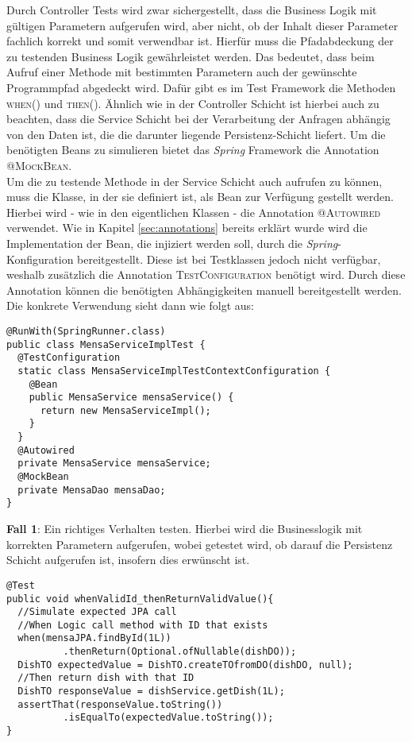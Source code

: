 Durch Controller Tests wird zwar sichergestellt, dass die Business Logik mit gültigen Parametern aufgerufen wird, aber nicht, ob der Inhalt dieser Parameter fachlich korrekt und somit verwendbar ist. Hierfür muss die Pfadabdeckung der zu testenden Business Logik gewährleistet werden. Das bedeutet, dass beim Aufruf einer Methode mit bestimmten Parametern auch der gewünschte Programmpfad abgedeckt wird. Dafür gibt es im Test Framework die Methoden \textsc{when()} und \textsc{then()}. Ähnlich wie in der Controller Schicht ist hierbei auch zu beachten, dass die Service Schicht bei der Verarbeitung der Anfragen abhängig von den Daten ist, die die darunter liegende Persistenz-Schicht liefert. Um die benötigten Beans zu simulieren bietet das \textit{Spring} Framework die Annotation \textsc{@MockBean}.\\
\linebreak
Um die zu testende Methode in der Service Schicht auch aufrufen zu können, muss die Klasse, in der sie definiert ist, als Bean zur Verfügung gestellt werden. Hierbei wird - wie in den eigentlichen Klassen - die Annotation \textsc{@Autowired} verwendet. Wie in Kapitel \ref{sec:annotations} bereits erklärt wurde wird die Implementation der Bean, die injiziert werden soll, durch die \textit{Spring}-Konfiguration bereitgestellt. Diese ist bei Testklassen jedoch nicht verfügbar, weshalb zusätzlich die Annotation \textsc{TestConfiguration} benötigt wird. Durch diese Annotation können die benötigten Abhängigkeiten manuell bereitgestellt werden. Die konkrete Verwendung sieht dann wie folgt aus:

\newpage
\begin{lstlisting}[caption={Basis Initialisierung für Service Tests}, commentstyle=\color{green},]
@RunWith(SpringRunner.class)
public class MensaServiceImplTest {
  @TestConfiguration
  static class MensaServiceImplTestContextConfiguration {
    @Bean
    public MensaService mensaService() {
      return new MensaServiceImpl();
    }
  }
  @Autowired
  private MensaService mensaService;
  @MockBean
  private MensaDao mensaDao;
}
\end{lstlisting}

\textbf{Fall 1}: Ein richtiges Verhalten testen. Hierbei wird die Businesslogik mit korrekten Parametern aufgerufen, wobei getestet wird, ob darauf die Persistenz Schicht aufgerufen ist, insofern dies erwünscht ist.

\begin{lstlisting}[caption={Testen von richtigen Verhalten}, commentstyle=\color{green},]
@Test
public void whenValidId_thenReturnValidValue(){
  //Simulate expected JPA call
  //When Logic call method with ID that exists
  when(mensaJPA.findById(1L))
          .thenReturn(Optional.ofNullable(dishDO));
  DishTO expectedValue = DishTO.createTOfromDO(dishDO, null);
  //Then return dish with that ID
  DishTO responseValue = dishService.getDish(1L);
  assertThat(responseValue.toString())
          .isEqualTo(expectedValue.toString());
}
\end{lstlisting}

